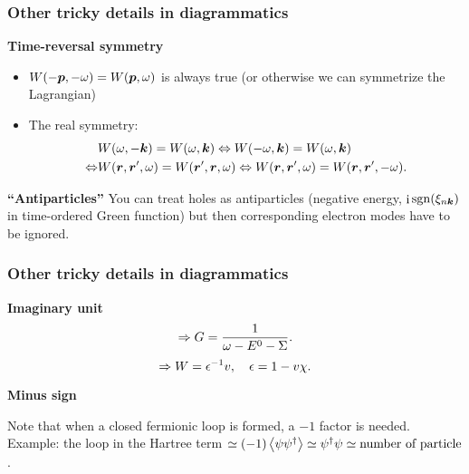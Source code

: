 \documentclass[t]{beamer}
\DeclareMathOperator{\ii}{i}
\DeclareMathOperator{\sgn}{sgn}
\begin{document}
\begin{frame}
\frametitle{Other tricky details in diagrammatics}

\textbf{Time-reversal symmetry}

\begin{itemize}
    \item $W(- \vb*{p} , -\omega) = W(\vb*{p}, \omega)$ is always true 
        (or otherwise we can symmetrize the Lagrangian)
    \item The real symmetry: 
    \begin{equation}
        \begin{aligned}
            &W(\omega, -\vb*{k}) = W(\omega, \vb*{k}) \Leftrightarrow 
            W(- \omega, \vb*{k}) = W(\omega, \vb*{k})  \\
            \Leftrightarrow &W(\vb*{r}, \vb*{r}', \omega) = W(\vb*{r}', \vb*{r}, \omega) \Leftrightarrow
            W(\vb*{r}, \vb*{r}', \omega) = W(\vb*{r}, \vb*{r}', - \omega).
        \end{aligned}
    \end{equation}
\end{itemize}

\textbf{``Antiparticles''} You can treat holes as antiparticles 
(negative energy, $\ii \sgn(\xi_{n \vb*{k}})$ in time-ordered Green function)
but then corresponding electron modes have to be ignored. 

\end{frame}

\begin{frame}
\frametitle{Other tricky details in diagrammatics}

\textbf{Imaginary unit} 
\begin{equation}
    \protect
    \Rightarrow G = \frac{1}{\omega - E^0 - \Sigma}.
\end{equation}    
\begin{equation}
    \protect
    \Rightarrow W = \epsilon^{-1} v, \quad \epsilon = 1 - v \chi.
\end{equation}

\textbf{Minus sign} 

Note that when a closed fermionic loop is formed, 
a $-1$ factor is needed. Example: the loop in the Hartree term
$\simeq (-1) \expval{\psi \psi^\dagger} \simeq \psi^\dagger \psi \simeq \text{number of particle}$.

\end{frame}
\end{document}
